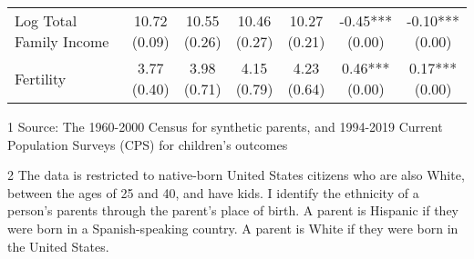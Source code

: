 \begin{table}[H]
{\begin{threeparttable}
\begin{tabular}[t]{>{\raggedright\arraybackslash}p{5cm}cccccc}
Log Total Family Income & \specialcell{10.72\\(0.09)} & \specialcell{10.55\\(0.26)} & \specialcell{10.46\\(0.27)} & \specialcell{10.27\\(0.21)} & \specialcell{-0.45***\\(0.00)} & \specialcell{-0.10***\\(0.00)}\\
Fertility & \specialcell{3.77\\(0.40)} & \specialcell{3.98\\(0.71)} & \specialcell{4.15\\(0.79)} & \specialcell{4.23\\(0.64)} & \specialcell{0.46***\\(0.00)} & \specialcell{0.17***\\(0.00)}\\
\bottomrule
\end{tabular}
\begin{tablenotes}
\item[1] Source: The 1960-2000 Census for synthetic parents, and 1994-2019 Current Population Surveys (CPS) for children's outcomes
\item[2] The data is restricted to native-born United States citizens who are also White, between the ages of 25 and 40, and have kids. I identify the ethnicity of a person's parents through the parent's place of birth. A parent is Hispanic if they were born in a Spanish-speaking country. A parent is White if they were born in the United States.
\end{tablenotes}
\end{threeparttable}}
\end{table}
